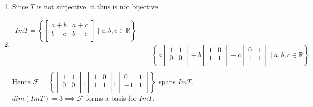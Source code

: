 \documentclass{report}
\begin{document}
{\begin{enumerate}[label=(\roman*)]
\begin{align*}
          \text{ ie. } dim \left( Im T \right) = 3\\
          \text{ but } dim \left( M_{2 \times 2} \right) = 4\\
          \implies Im T \neq M_{2 \times 2} 
         .\end{align*}
         Hence $ T$ is not surjective.\\
        \item   Since $ T$ is not surjective, it thus is not bijective.\\
        \item  
         \begin{align*}
          Im T = \left\{ \begin{bmatrix}
          a+b & a+c\\
           b-c& b+c \\
          \end{bmatrix} \mid a, b,c \in \mathbb{R} \right\}                                    \\
          & = \left\{ a \begin{bmatrix}
          1 & 1\\
          0 & 0\\
          \end{bmatrix} + b \begin{bmatrix}
          1 & 0\\
          1 & 1\\
          \end{bmatrix} + c \begin{bmatrix}
          0 & 1\\
          1 & 1\\
          \end{bmatrix} \mid a,b,c \in \mathbb{R} \right\}  \\
         .\end{align*}
         Hence $ \mathcal{F} = \left\{ \begin{bmatrix}
         1 & 1\\
         0 & 0\\
         \end{bmatrix}, \begin{bmatrix}
         1 & 0\\
         1 & 1\\
         \end{bmatrix}, \begin{bmatrix}
         0 & 1\\
         -1 & 1\\
         \end{bmatrix} \right\}$  spans $ Im T$.\\
         $ dim \left(  Im T \right) = 3 \implies \mathcal{F} $ forms a basis for $ Im T$.\\
        \end{enumerate}
 }
\end{document}
